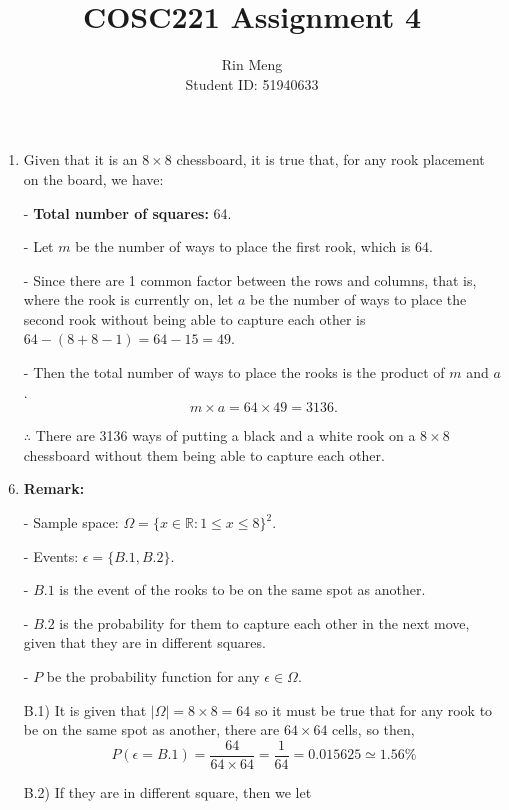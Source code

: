 \documentclass[12pt]{article}
\begin{document}
\title{COSC221 Assignment 4}
\author{Rin Meng \\ Student ID: 51940633}
\maketitle


\begin{enumerate}[label=Part \Alph*)]
    \item Given that it is an $8 \times 8$ chessboard, it is true that, for any rook placement on the board, we have:
    \item[-] \textbf{Total number of squares:} 64.
    \item[-] Let $m$ be the number of ways to place the first rook, which is $64$.
    \item[-] Since there are 1 common factor between the rows and columns, that is, where the rook is currently on, let $a$ be the number of ways to place the second rook without being able to capture each other is $64 - (8 + 8 - 1) = 64 - 15 = 49$. 
    \item[-] Then the total number of ways to place the rooks is the product of $m$ and $a$. 
    $$m \times a = 64 \times 49 = 3136.$$
    
    $\therefore$ There are 3136 ways of putting a black and a white rook on a $8 \times 8$ chessboard without them being able to capture each other.
    
    \item \textbf{Remark:}
    \item[-] Sample space: $\Omega = \{x \in \mathbb{R} : 1 \leq x \leq 8\}^2$.
    \item[-] Events: $\epsilon = \{B.1, B.2\}$.
    \item[-] $B.1$ is the event of the rooks to be on the same spot as another.
    \item[-] $B.2$ is the probability for them to capture each other in the next move, given that they are in different squares.
    \item[-] $P$ be the probability function for any $\epsilon \in \Omega$.
    
    \item[B.1)] It is given that $|\Omega| = 8 \times 8 = 64$ so it must be true that for any rook to be on the same spot as another, there are $64 \times 64$ cells, so then,
    $$P(\epsilon = B.1) = \frac{64}{64 \times 64} = \frac{1}{64} = 0.015625 \simeq 1.56\%$$
    
    \item[B.2)] If they are in different square, then we let 
    

\end{enumerate}
\end{document}
